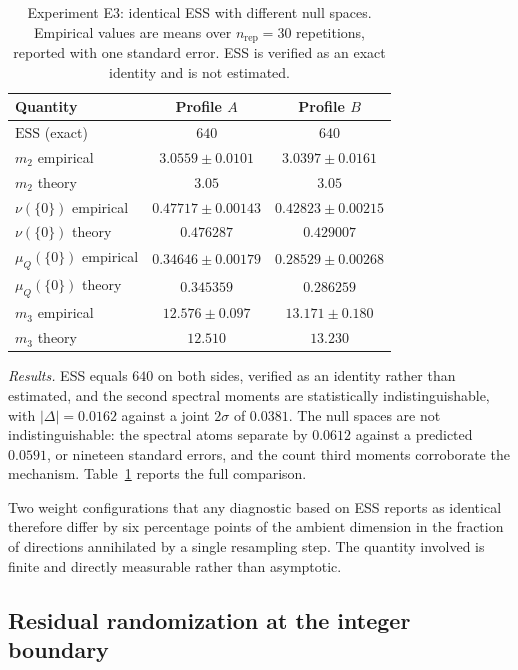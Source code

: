 \documentclass[lettersize,journal]{IEEEtran}
\theoremstyle{remark}
\begin{document}
\begin{table}[!t]
\renewcommand{\arraystretch}{1.25}
\caption{Experiment E3: identical ESS with different null spaces. Empirical
  values are means over $n_{\mathrm{rep}}=30$ repetitions, reported with one
  standard error. ESS is verified as an exact identity and is not estimated.}
\label{tab:e3}
\centering
\begin{tabular}{lcc}
\toprule
Quantity & Profile $A$ & Profile $B$ \\
\midrule
$\mathrm{ESS}$ (exact)   & $640$ & $640$ \\
$m_2$ empirical          & $3.0559\pm0.0101$ & $3.0397\pm0.0161$ \\
$m_2$ theory             & $3.05$ & $3.05$ \\
$\nu(\{0\})$ empirical   & $0.47717\pm0.00143$ & $0.42823\pm0.00215$ \\
$\nu(\{0\})$ theory      & $0.476287$ & $0.429007$ \\
$\mu_Q(\{0\})$ empirical & $0.34646\pm0.00179$ & $0.28529\pm0.00268$ \\
$\mu_Q(\{0\})$ theory    & $0.345359$ & $0.286259$ \\
$m_3$ empirical          & $12.576\pm0.097$ & $13.171\pm0.180$ \\
$m_3$ theory             & $12.510$ & $13.230$ \\
\bottomrule
\end{tabular}
\end{table}

\emph{Results.} ESS equals $640$ on both sides, verified as an identity
rather than estimated, and the second spectral moments are statistically
indistinguishable, with $|\Delta|=0.0162$ against a joint $2\sigma$ of
$0.0381$. The null spaces are not indistinguishable: the spectral atoms
separate by $0.0612$ against a predicted $0.0591$, or nineteen standard errors,
and the count third moments corroborate the mechanism.
Table~\ref{tab:e3} reports the full comparison.

Two weight configurations that any diagnostic based on ESS reports as identical
therefore differ by six percentage points of the ambient dimension in the
fraction of directions annihilated by a single resampling step. The quantity
involved is finite and directly measurable rather than asymptotic.

\subsection{Residual randomization at the integer boundary}
\label{sec:ix-e4}
\end{document}
